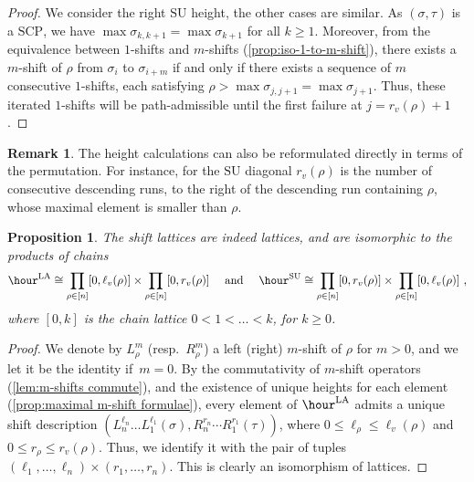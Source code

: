 \documentclass{amsart}
\newtheorem{proposition}[theorem]{Proposition}
\theoremstyle{definition}
\newtheorem{remark}[theorem]{Remark}
\newcommand{\resp}{resp.~} %
\newcommand{\SU}{\mathrm{SU}}
\newcommand{\LA}{\mathrm{LA}}
\newcommand{\SCP}{\mathrm{SCP}}
\begin{document}
\begin{proof}
We consider the right $\SU$ height, the other cases are similar. 
As $(\sigma,\tau)$ is a $\SCP$, we have $\max \sigma_{k,k+1} = \max \sigma_{k+1}$ for all $k\geq 1$. 
Moreover, from the equivalence between $1$-shifts and $m$-shifts (\cref{prop:iso-1-to-m-shift}), there exists a $m$-shift of $\rho$ from $\sigma_i$ to $\sigma_{i+m}$ if and only if there exists a sequence of $m$ consecutive $1$-shifts, each satisfying $\rho > \max \sigma_{j,j+1}=\max \sigma_{j+1}$.
Thus, these iterated $1$-shifts will be path-admissible until the first failure at $j=r_v(\rho)+1$.
\end{proof}

\begin{remark}
The height calculations can also be reformulated directly in terms of the permutation.
For instance, for the $\SU$ diagonal $r_v(\rho)$ is the number of consecutive descending runs, to the right of the descending run containing $\rho$, whose maximal element is smaller than $\rho$.
\end{remark}

\begin{proposition} 
\label{prop:shift lattice}
The shift lattices are indeed lattices, and are isomorphic to the products of chains
\begin{align*}
\hour^\LA \cong \prod_{\rho \in [n]} [0,\ell_v(\rho)] \times \prod_{\rho \in [n]} [0,r_v(\rho)]
\quad \text{ and } \quad
\hour^\SU \cong \prod_{\rho \in [n]} [0,r_v(\rho)] \times \prod_{\rho \in [n]} [0,\ell_v(\rho)] \ ,
\end{align*}
where $[0,k]$ is the chain lattice $0<1<\dots<k$, for $k\geq 0$.
\end{proposition}

\begin{proof}
We denote by $L_\rho^m$ (\resp $R_\rho^m$) a left (right) $m$-shift of $\rho$ for $m>0$, and we let it be the identity if~$m=0$.
By the commutativity of $m$-shift operators (\cref{lem:m-shifts commute}), and the existence of unique heights for each element (\cref{prop:maximal m-shift formulae}), every element of $\hour^\LA$ admits a unique shift description $(L^{\ell_n}_{n} \dots L^{\ell_1}_{1}(\sigma),
R^{r_n}_{n}\cdots R^{r_{1}}_{1}(\tau))$, where $0\leq \ell_\rho\leq \ell_v(\rho)$ and $0\leq r_\rho\leq r_v(\rho)$.
Thus, we identify it with the pair of tuples $(\ell_1,\ldots,\ell_n)\times (r_1,\ldots,r_n)$.
This is clearly an isomorphism of lattices.
\end{proof}
\end{document}
